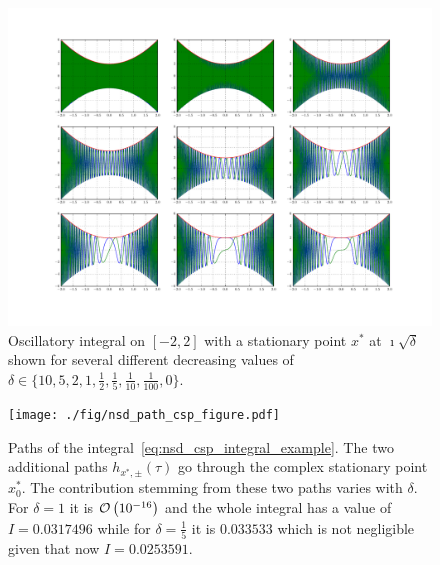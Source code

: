 \documentclass[a4paper,10pt]{article}
\begin{document}
\begin{figure}
  \centering
  \includegraphics[width=\linewidth]{./fig/oscillatory_integral_complex_sp.pdf}
  \caption{Oscillatory integral on $[-2,2]$ with a stationary point $x^{*}$ at $\imath \sqrt{\delta}$
  shown for several different decreasing values of
  $\delta \in \{10, 5, 2, 1, \frac{1}{2}, \frac{1}{5}, \frac{1}{10}, \frac{1}{100}, 0\}$.}
  \label{fig:oscillatory_integral_complex_sp}
\end{figure}

\begin{figure}
  \centering
  \texttt{[image: ./fig/nsd\_path\_csp\_figure.pdf]}
  \caption{Paths of the integral~\eqref{eq:nsd_csp_integral_example}.
  The two additional paths $h_{x^{*},{\pm}}(\tau)$ go through the complex
  stationary point $x_0^{*}$. The contribution stemming from these two paths
  varies with $\delta$. For $\delta = 1$ it is $\mathcal{O}\left( 10^{-16} \right)$ and the whole
  integral has a value of $I = 0.0317496$ while for $\delta = \frac{1}{5}$ it is
  $0.033533$ which is not negligible given that now $I = 0.0253591$.}
  \label{fig:oscillatory_integral_complex_sp_paths}
\end{figure}
\end{document}
